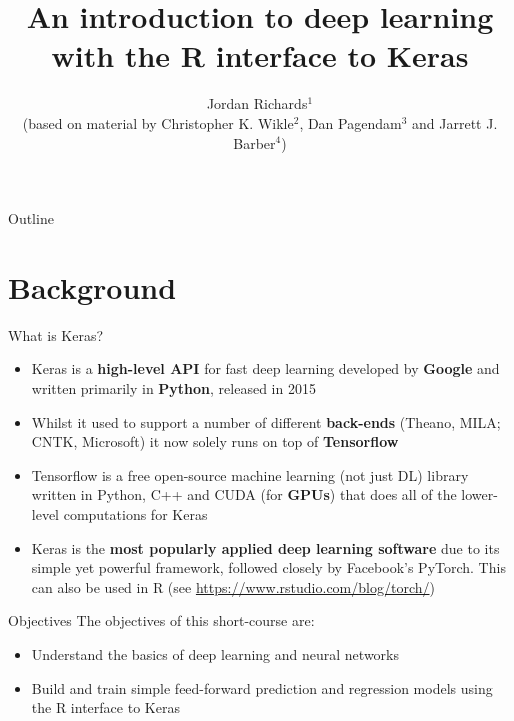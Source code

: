 \documentclass{beamer}
\title[cde-Rkeras-intro]{An introduction to deep learning with the R interface to Keras}
\author[Jordan Richards]{Jordan Richards$^1$\\ (based on material by Christopher K. Wikle$^2$, Dan Pagendam$^3$ and Jarrett J. Barber$^4$) }
\institute[KAUST]{$^1$King Abdullah University of Science and Technology (KAUST)\\
($^2$University of Missouri, $^3$CSIRO Data61, Brisbane, Australia, $^4$Northern Arizona University)}
\date{}
\begin{document}
\maketitle
\begin{frame}{Outline}
\tableofcontents
\end{frame}
\section{Background}
\begin{frame}{What is Keras?}
\begin{itemize}
\item Keras is a \textbf{high-level API} for fast deep learning developed by \textbf{Google} and written primarily in \textbf{Python}, released in 2015
\item Whilst it used to support a number of different \textbf{back-ends} (Theano, MILA; CNTK, Microsoft) it now solely runs on top of \textbf{Tensorflow}
\item Tensorflow is a free open-source machine learning (not just DL) library written in Python, C++ and CUDA (for \textbf{GPUs}) that does all of the lower-level computations for Keras
\item Keras is the \textbf{most popularly applied deep learning software} due to its simple yet powerful framework, followed closely by Facebook's PyTorch. This can also be used in R (see \url{https://www.rstudio.com/blog/torch/})
\end{itemize}

\end{frame}


\begin{frame}{Objectives}
The objectives of this short-course are:
\begin{itemize}
\item Understand the basics of deep learning and neural networks
\item Build and train simple feed-forward prediction and regression models using the R interface to Keras
\end{itemize}
\end{frame}
\end{document}
